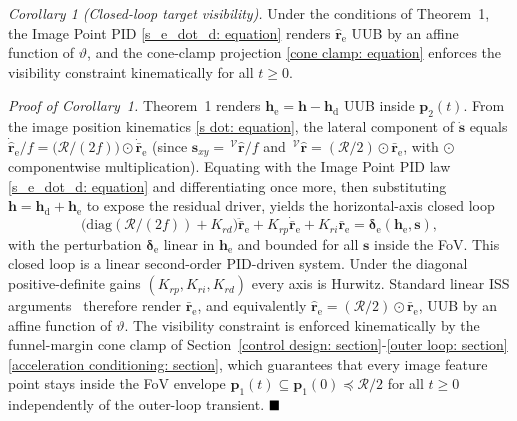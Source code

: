 \documentclass{IEEEtaes}
\begin{document}
\textit{Corollary 1 (Closed-loop target visibility).} Under the conditions of Theorem~1, the Image Point PID \eqref{s_e_dot_d: equation} renders $\hat{\boldsymbol{r}}_\text{e}$ UUB by an affine function of $\vartheta$, and the cone-clamp projection \eqref{cone clamp: equation} enforces the visibility constraint kinematically for all $t\ge 0$.

\textit{Proof of Corollary~1.} Theorem~1 renders $\boldsymbol{h}_\text{e}=\boldsymbol{h}-\boldsymbol{h}_\text{d}$ UUB inside $\boldsymbol{p}_2(t)$. From the image position kinematics \eqref{s dot: equation}, the lateral component of $\dot{\boldsymbol{s}}$ equals $\dot{\hat{\boldsymbol{r}}}_\text{e}/f=\big(\mathcal{R}/(2f)\big)\odot\dot{\bar{\boldsymbol{r}}}_\text{e}$ (since $\boldsymbol{s}_{xy}=\,^\mathcal{V}\hat{\boldsymbol{r}}/f$ and $\,^\mathcal{V}\hat{\boldsymbol{r}}=(\mathcal{R}/2)\odot\bar{\boldsymbol{r}}_\text{e}$, with $\odot$ componentwise multiplication). Equating with the Image Point PID law \eqref{s_e_dot_d: equation} and differentiating once more, then substituting $\boldsymbol{h}=\boldsymbol{h}_\text{d}+\boldsymbol{h}_\text{e}$ to expose the residual driver, yields the horizontal-axis closed loop
\begin{equation*}
    \big(\text{diag}(\mathcal{R}/(2f))+K_{rd}\big)\ddot{\bar{\boldsymbol{r}}}_\text{e} + K_{rp}\dot{\bar{\boldsymbol{r}}}_\text{e} + K_{ri}\bar{\boldsymbol{r}}_\text{e} = \boldsymbol{\delta}_\text{e}(\boldsymbol{h}_\text{e},\boldsymbol{s}),
\end{equation*}
with the perturbation $\boldsymbol{\delta}_\text{e}$ linear in $\boldsymbol{h}_\text{e}$ and bounded for all $\boldsymbol{s}$ inside the FoV. This closed loop is a linear second-order PID-driven system. Under the diagonal positive-definite gains $(K_{rp},K_{ri},K_{rd})$ every axis is Hurwitz. Standard linear ISS arguments~\cite{khalil2002} therefore render $\bar{\boldsymbol{r}}_\text{e}$, and equivalently $\hat{\boldsymbol{r}}_\text{e}=(\mathcal{R}/2)\odot\bar{\boldsymbol{r}}_\text{e}$, UUB by an affine function of $\vartheta$. The visibility constraint is enforced kinematically by the funnel-margin cone clamp of Section~\ref{control design: section}-\ref{outer loop: section}\ref{acceleration conditioning: section}, which guarantees that every image feature point stays inside the FoV envelope $\boldsymbol{p}_1(t)\subseteq\boldsymbol{p}_1(0)\preceq\mathcal{R}/2$ for all $t\ge 0$ independently of the outer-loop transient. $\hfill\blacksquare$
\end{document}
